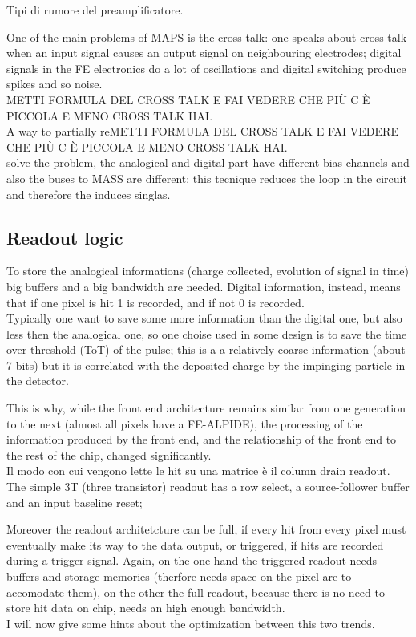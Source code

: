 \begin{titlepage}
Tipi di rumore del preamplificatore.

One of the main problems of MAPS is the cross talk: one speaks about cross talk
when an input signal causes an output signal on neighbouring electrodes; digital signals
in the FE electronics do a lot of oscillations and digital switching produce spikes
and so noise.\\
METTI FORMULA DEL CROSS TALK E FAI VEDERE CHE PIÙ C È PICCOLA E MENO CROSS TALK HAI.\\
A way to partially reMETTI FORMULA DEL CROSS TALK E FAI VEDERE CHE PIÙ C È PICCOLA E MENO CROSS TALK HAI.\\
solve the problem, the analogical and digital part have different
bias channels and also the buses to MASS are different: this tecnique reduces the
loop in the circuit and therefore the induces singlas.\\





\subsection{Readout logic}
To store the analogical informations (charge collected, evolution of signal in time)
big buffers and a big bandwidth are needed.
Digital information, instead, means that if one pixel is hit 1 is recorded, and if
not 0 is recorded.\\
Typically one want to save some more information than the digital one, but also
less then the analogical one, so one choise used in some design is to save the time over threshold
(ToT) of the pulse; this is a a relatively coarse information (about 7 bits) but it
is correlated with the deposited charge by the impinging particle in the detector.

This is why, while the front end architecture remains similar from one generation
to the next (almost all pixels have a FE-ALPIDE), the processing of the information
produced by the front end, and the relationship of the front end to the rest of
the chip, changed significantly.\\
Il modo con cui vengono lette le hit su una matrice è il column drain readout.\\
The simple 3T (three transistor) readout has a row select, a
source-follower buffer and an input baseline reset;

Moreover the readout architetcture can be full, if every hit from every pixel must eventually
make its way to the data output, or triggered, if hits are recorded during a trigger signal.
Again, on the one hand the triggered-readout needs buffers and storage memories
(therfore needs space on the pixel are to accomodate them), on the other the full readout,
because there is no need to store hit data on chip, needs an high enough bandwidth.\\
I will now give some hints about the optimization between this two trends.


\end{titlepage}
